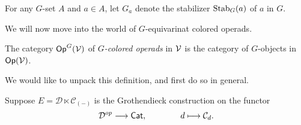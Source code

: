 \documentclass[a4paper,10pt
,draft
]{article}%
\renewcommand{\1}{\ensuremath{\mathbb{id}}}
\begin{document}
\begin{notation}
      For any $G$-set $A$ and $a \in A$, let $G_a$ denote the stabilizer $\mathrm{Stab}_G(a)$ of $a$ in $G$.
\end{notation}

We will now move into the world of $G$-equivarinat colored operads.

\begin{definition}
      The category $\mathsf{Op}^G(\mathcal V)$ of  \textit{$G$-colored operads} in $\mathcal V$ is the category of
      $G$-objects in $\mathsf{Op}(\mathcal V)$.
\end{definition}


We would like to unpack this definition, and first do so in general.


Suppose $E = \mathcal D \ltimes \mathcal C_{(-)}$ is the Grothendieck construction on the functor
\begin{equation}
      \mathcal D^{op} \longrightarrow \mathsf{Cat},
      \qquad \qquad
      d \longmapsto \mathcal C_d.
\end{equation}
\end{document}
